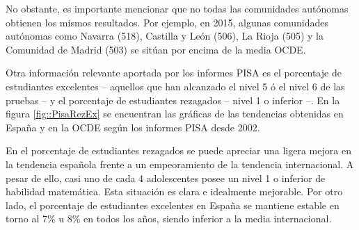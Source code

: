 No obstante, es importante mencionar que no todas las comunidades autónomas obtienen los mismos resultados. 
%
Por ejemplo, en 2015, algunas comunidades autónomas como Navarra (518), Castilla y León (506), La Rioja (505) y la Comunidad de Madrid (503) se sitúan por encima de la media OCDE.


Otra información relevante aportada por los informes PISA es el porcentaje de estudiantes excelentes -- aquellos que han alcanzado el nivel 5 ó el nivel 6 de las pruebas -- y el porcentaje de estudiantes rezagados -- nivel 1 o inferior --.
%
En la figura \ref{fig::PisaRezEx} se encuentran las gráficas de las tendencias obtenidas en España y en la OCDE según los informes PISA desde 2002.



En el porcentaje de estudiantes rezagados se puede apreciar una ligera mejora en la tendencia española frente a un empeoramiento de la tendencia internacional.
%
A pesar de ello, casi uno de cada 4 adolescentes posee un nivel 1 o inferior de habilidad matemática. 
%
Esta situación es clara e idealmente mejorable.
%
Por otro lado, el porcentaje de estudiantes excelentes en España se mantiene estable en torno al 7\% u 8\% en todos los años, siendo inferior a la media internacional.

